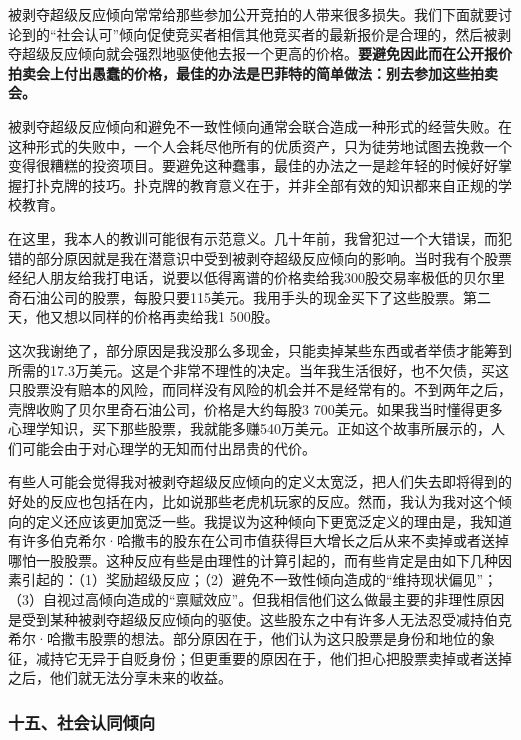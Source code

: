 被剥夺超级反应倾向常常给那些参加公开竞拍的人带来很多损失。我们下面就要讨论到的“社会认可”倾向促使竞买者相信其他竞买者的最新报价是合理的，然后被剥夺超级反应倾向就会强烈地驱使他去报一个更高的价格。\textbf{要避免因此而在公开报价拍卖会上付出愚蠢的价格，最佳的办法是巴菲特的简单做法：别去参加这些拍卖会。}
\par

被剥夺超级反应倾向和避免不一致性倾向通常会联合造成一种形式的经营失败。在这种形式的失败中，一个人会耗尽他所有的优质资产，只为徒劳地试图去挽救一个变得很糟糕的投资项目。要避免这种蠢事，最佳的办法之一是趁年轻的时候好好掌握打扑克牌的技巧。扑克牌的教育意义在于，并非全部有效的知识都来自正规的学校教育。
\par

在这里，我本人的教训可能很有示范意义。几十年前，我曾犯过一个大错误，而犯错的部分原因就是我在潜意识中受到被剥夺超级反应倾向的影响。当时我有个股票经纪人朋友给我打电话，说要以低得离谱的价格卖给我300股交易率极低的贝尔里奇石油公司的股票，每股只要115美元。我用手头的现金买下了这些股票。第二天，他又想以同样的价格再卖给我1 500股。
\par

这次我谢绝了，部分原因是我没那么多现金，只能卖掉某些东西或者举债才能筹到所需的17.3万美元。这是个非常不理性的决定。当年我生活很好，也不欠债，买这只股票没有赔本的风险，而同样没有风险的机会并不是经常有的。不到两年之后，壳牌收购了贝尔里奇石油公司，价格是大约每股3 700美元。如果我当时懂得更多心理学知识，买下那些股票，我就能多赚540万美元。正如这个故事所展示的，人们可能会由于对心理学的无知而付出昂贵的代价。
\par

有些人可能会觉得我对被剥夺超级反应倾向的定义太宽泛，把人们失去即将得到的好处的反应也包括在内，比如说那些老虎机玩家的反应。然而，我认为我对这个倾向的定义还应该更加宽泛一些。我提议为这种倾向下更宽泛定义的理由是，我知道有许多伯克希尔·哈撒韦的股东在公司市值获得巨大增长之后从来不卖掉或者送掉哪怕一股股票。这种反应有些是由理性的计算引起的，而有些肯定是由如下几种因素引起的：（1）奖励超级反应；（2）避免不一致性倾向造成的“维持现状偏见”；（3）自视过高倾向造成的“禀赋效应”。但我相信他们这么做最主要的非理性原因是受到某种被剥夺超级反应倾向的驱使。这些股东之中有许多人无法忍受减持伯克希尔·哈撒韦股票的想法。部分原因在于，他们认为这只股票是身份和地位的象征，减持它无异于自贬身份；但更重要的原因在于，他们担心把股票卖掉或者送掉之后，他们就无法分享未来的收益。
\par

\subsubsection*{十五、社会认同倾向}


